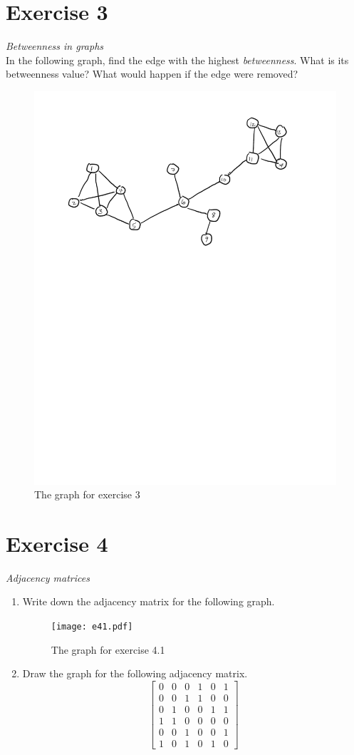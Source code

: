 \documentclass{tufte-handout}
\begin{document}
\begin{fullwidth}
\section*{\textbf{Exercise 3}}
\textit{Betweenness in graphs}\\
In the following graph, find the edge with the highest \textit{betweenness}. What is its betweenness value? What would happen if the edge were removed?
\begin{figure}[!h]
        \centering
        \includegraphics[width=.4\textwidth]{e3.pdf}
        \caption{The graph for exercise 3}
        \label{fig:e3}
    \end{figure}
\newpage
\section*{\textbf{Exercise 4}}
\textit{Adjacency matrices}\\
\begin{enumerate}
    \item Write down the adjacency matrix for the following graph.
    \begin{figure}[!h]
        \centering
        \texttt{[image: e41.pdf]}
        \caption{The graph for exercise 4.1}
        \label{fig:e41}
    \end{figure}
    \item Draw the graph for the following adjacency matrix. 
    $$
    \begin{bmatrix}
    0 & 0 & 0 & 1 & 0 & 1 \\
    0 & 0 & 1 & 1 & 0 & 0 \\
    0 & 1 & 0 & 0 & 1 & 1 \\
    1 & 1 & 0 & 0 & 0 & 0 \\
    0 & 0 & 1 & 0 & 0 & 1 \\
    1 & 0 & 1 & 0 & 1 & 0 
    \end{bmatrix}
    $$
\end{enumerate}

\end{fullwidth}
\end{document}
